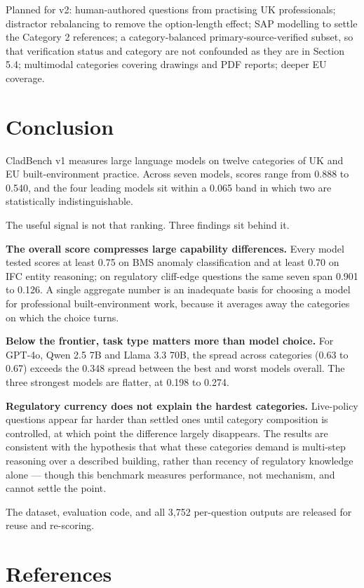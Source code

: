 \documentclass[11pt,a4paper]{article}
\begin{document}
Planned for v2: human-authored questions from practising UK professionals; distractor rebalancing to remove the option-length effect; SAP modelling to settle the Category 2 references; a category-balanced primary-source-verified subset, so that verification status and category are not confounded as they are in Section 5.4; multimodal categories covering drawings and PDF reports; deeper EU coverage.


\section{Conclusion}

CladBench v1 measures large language models on twelve categories of UK and EU built-environment practice. Across seven models, scores range from 0.888 to 0.540, and the four leading models sit within a 0.065 band in which two are statistically indistinguishable.

The useful signal is not that ranking. Three findings sit behind it.

\textbf{The overall score compresses large capability differences.} Every model tested scores at least 0.75 on BMS anomaly classification and at least 0.70 on IFC entity reasoning; on regulatory cliff-edge questions the same seven span 0.901 to 0.126. A single aggregate number is an inadequate basis for choosing a model for professional built-environment work, because it averages away the categories on which the choice turns.

\textbf{Below the frontier, task type matters more than model choice.} For GPT-4o, Qwen 2.5 7B and Llama 3.3 70B, the spread across categories (0.63 to 0.67) exceeds the 0.348 spread between the best and worst models overall. The three strongest models are flatter, at 0.198 to 0.274.

\textbf{Regulatory currency does not explain the hardest categories.} Live-policy questions appear far harder than settled ones until category composition is controlled, at which point the difference largely disappears. The results are consistent with the hypothesis that what these categories demand is multi-step reasoning over a described building, rather than recency of regulatory knowledge alone --- though this benchmark measures performance, not mechanism, and cannot settle the point.

The dataset, evaluation code, and all 3,752 per-question outputs are released for reuse and re-scoring.


\section*{References}
\end{document}
